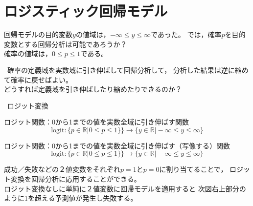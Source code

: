 \newcommand{\Draft}{}
\newcommand{\Slide}{}
\newcommand{\PrintLecture}{1}
\newcommand{\PrintSolution}{1}








\maketitle

\MyFrame{}{\tableofcontents}

\section{ロジスティック回帰モデル}

\MyFrame{\insertsection}
{
  回帰モデルの目的変数$y$の値域は，$-\infty\le y \le \infty$であった。
  では，確率$p$を目的変数とする回帰分析は可能であろうか？\\
  確率の値域は，$0\le p \le 1$である。
}

\MyFrame{\insertsection}
{
  \ra~確率の定義域を実数域に引き伸ばして回帰分析して，
  分析した結果は逆に縮めて確率に戻せばよい。\\
  どうすれば定義域を引き伸ばしたり縮めたりできるのか？\\[3mm]
  \begin{center}
    \ra~ロジット変換
  \end{center}
}

{
  ロジット関数：0から1までの値を実数全域に引き伸ばす関数
  \[\mathrm{logit}: \{p\in \mathds{R}|0\le p\le 1\}\}
  \rightarrow \{y\in \mathds{R}|-\infty \le y \le \infty\}\]
}

{
  ロジット関数：0から1までの値を実数全域に引き伸ばす（写像する）関数
  \[\mathrm{logit}: \{p\in \mathds{R}|0\le p\le 1\}\}
  \rightarrow \{y\in \mathds{R}|-\infty \le y \le \infty\}\]
}

\MyFrame{}
{
  成功／失敗などの２値変数をそれぞれ$p=1$と$p=0$に割り当てることで，
  ロジット変換を回帰分析に応用することができる。\\
  ロジット変換なしに単純に２値変数に回帰モデルを適用すると
  次図右上部分のように1を超える予測値が発生し失敗する。
}


